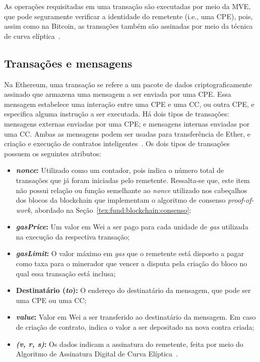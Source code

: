 As operações requisitadas em uma transação são executadas por meio da MVE, que pode seguramente verificar a identidade do remetente (i.e., uma CPE), pois, assim como na Bitcoin, as transações também são assinadas por meio da técnica de curva elíptica~\cite{ethereum-homestead2020documentation}.

\subsection{Transações e mensagens} \label{tex:fund:ethereum:transacao-msgs}

Na Ethereum, uma transação se refere a um pacote de dados criptograficamente assinado que armazena uma mensagem a ser enviada por uma CPE. Essa mensagem estabelece uma interação entre uma CPE e uma CC, ou outra CPE, e especifica alguma instrução a ser executada. Há dois tipos de transações: mensagens externas enviadas por uma CPE; e mensagens internas enviadas por uma CC. Ambas as mensagens podem ser usadas para transferência de Ether, e criação e execução de contratos inteligentes~\cite{wood2014ethereum-yellow-paper}. Os dois tipos de transações possuem os seguintes atributos:
\begin{itemize}
    \item \textbf{\textit{nonce}:} Utilizado como um contador, pois indica o número total de transações que já foram iniciadas pelo remetente. Ressalta-se que, este item não possui relação ou função semelhante ao \textit{nonce} utilizado nos cabeçalhos dos blocos da blockchain que implementam o algoritmo de consenso \textit{proof-of-work}, abordado na Seção~\ref{tex:fund:blockchain:consenso};
    \item \textbf{\textit{gasPrice}:} Um valor em Wei a ser pago para cada unidade de \textit{gas} utilizada na execução da respectiva transação;
    \item \textbf{\textit{gasLimit}:} O valor máximo em \textit{gas} que o remetente está disposto a pagar como taxa para o minerador que vencer a disputa pela criação do bloco no qual essa transação está inclusa;
    \item \textbf{Destinatário (\textit{to}):} O endereço do destinatário da mensagem, que pode ser uma CPE ou uma CC;
    \item \textbf{\textit{value}:} Valor em Wei a ser transferido ao destinatário da mensagem. Em caso de criação de contrato, indica o valor a ser depositado na nova contra criada;
    \item \textbf{\textit{(v, r, s)}:} Os dados indicam a assinatura do remetente, feita por meio do Algoritmo de Assinatura Digital de Curva Elíptica~\cite{johnson2001elliptic-ethereum}.
\end{itemize}

